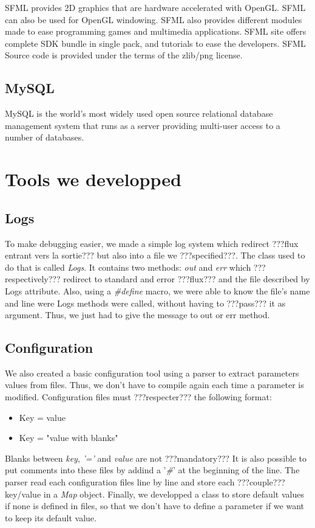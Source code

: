 \documentclass{scrreprt}
\begin{document}
		  SFML provides 2D graphics that are hardware accelerated with OpenGL. SFML can also be used for OpenGL windowing. SFML also provides different modules made to ease programming games and multimedia applications. SFML site offers complete SDK bundle in single pack, and tutorials to ease the developers. SFML Source code is provided under the terms of the zlib/png license.

		  \subsection{MySQL}
		  MySQL is the world's most widely used open source relational database management system that runs as a server providing multi-user access to a number of databases.
		  \section{Tools we developped} 
		  \subsection{Logs}
		  To make debugging easier, we made a simple log system which redirect ???flux entrant vers la sortie??? but also into a file we ???specified???. The class used to do that is called \emph{Logs}. It contains two methods: \emph{out} and \emph{err} which ???respectively??? redirect to standard and error ???flux??? and the file described by Logs attribute. Also, using a \emph{\#define} macro, we were able to know the file's name and line were Logs methods were called, without having to ???pass??? it as argument. Thus, we just had to give the message to out or err method.
		  \subsection{Configuration}
		  We also created a basic configuration tool using a parser to extract parameters values from files. Thus, we don't have to compile again each time a parameter is modified. Configuration files must ???respecter??? the following format:
		  \begin{itemize}
		  \item{Key = value}
		  \item{Key = "value with blanks"}
		  \end{itemize}
		
		  Blanks between \emph{key}, \emph{'='} and \emph{value} are not ???mandatory???
		  It is also possible to put comments into these files by addind a '\emph{\#}' at the beginning of the line. The parser read each configuration files line by line and store each ???couple??? key/value in a \emph{Map} object. Finally, we developped a class to store default values if none is defined in files, so that we don't have to define a parameter if we want to keep its default value.
\end{document}
